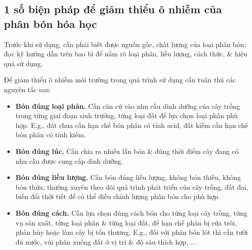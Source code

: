 \documentclass{article}
\begin{document}
\subsection{1 số biện pháp để giảm thiểu ô nhiễm của phân bón hóa học}
Trước khi sử dụng, cần phải biết được nguồn gốc, chất lượng của loại phân bón; đọc kỹ hướng dẫn trên bao bì để nắm rõ loại phân, liều lượng, cách thức, \& hiệu quả sử dụng.

Để giảm thiểu ô nhiễm môi trường trong quá trình sử dụng cần tuân thủ các nguyên tắc sau:
\begin{itemize}
	\item \textbf{Bón đúng loại phân.} Cần căn cứ vào nhu cầu dinh dưỡng của cây trồng trong từng giai đoạn sinh trưởng, từng loại đất để lựa chọn loại phân phù hợp. E.g., đất chua cần hạn chế bón phân có tính acid, đất kiềm cần hạn chế bón phân có tính kiềm.
	\item \textbf{Bón đúng lúc.} Cần chia ra nhiều lần bón \& đúng thời điểm cây đang có nhu cầu được cung cấp dinh dưỡng.
	\item \textbf{Bón đúng liều lượng.} Cần bón đúng liều lượng, không bón thiếu, không bón thừa; thường xuyên theo dõi quá trình phát triển của cây trồng, đất đai, biến đổi thời tiết để có thể điều chỉnh lượng phân bón cho phù hợp.
	\item \textbf{Bón đúng cách.} Cần lựa chọn đúng cách bón cho từng loại cây trồng, từng vụ sản xuất, từng loại phân \& từng loại đất, để hạn chế phân bị rửa trôi, phân hủy hoặc làm cây bị tổn thương. E.g., đối với phân bón lót thì cần tưới đủ nước, vùi phân xuống đất ở vị trí \& độ sâu thích hợp, $\ldots$
\end{itemize}
\noindent{}


\printbibliography[heading=bibintoc]
	
\end{document}
